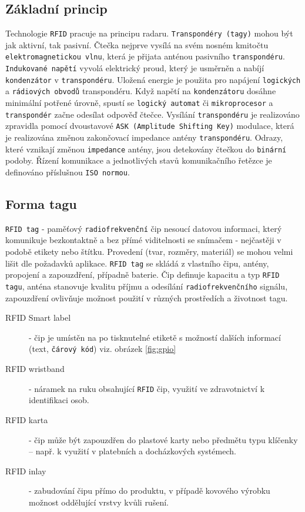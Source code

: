 \documentclass[czech,BP]{thesiskiv}
\begin{document}
\subsection{Základní princip}
Technologie \texttt{RFID} pracuje na principu radaru. \texttt{Transpondéry (tagy)} mohou být jak aktivní, tak pasivní. Čtečka nejprve vysílá na svém nosném kmitočtu \texttt{elektromagnetickou vlnu}, která je přijata anténou pasivního \texttt{transpondéru}. \texttt{Indukované napětí} vyvolá elektrický proud, který je usměrněn a nabíjí \texttt{kondenzátor} v \texttt{transpondéru}. Uložená energie je použita pro napájení \texttt{logických} a \texttt{rádiových obvodů} transpondéru. Když napětí na \texttt{kondenzátoru} dosáhne minimální potřené úrovně, spustí se \texttt{logický automat} či \texttt{mikroprocesor} a \texttt{transpondér} začne odesílat odpověď čtečce. Vysílání \texttt{transpondéru} je realizováno zpravidla pomocí dvoustavové \texttt{ASK (Amplitude Shifting Key)} modulace, která je realizována změnou zakončovací impedance antény \texttt{transpondéru}. Odrazy, které vznikají změnou \texttt{impedance} antény, jsou detekovány čtečkou do \texttt{binární} podoby. Řízení komunikace a jednotlivých stavů komunikačního řetězce je definováno příslušnou \texttt{ISO normou}.\cite{dolevcek2010identifikace}

\subsection{Forma tagu}
\texttt{RFID tag} - paměťový \texttt{radiofrekvenční} čip nesoucí datovou informaci, který komunikuje bezkontaktně a bez přímé viditelnosti se snímačem - nejčastěji v podobě etikety nebo štítku. Provedení (tvar, rozměry, materiál) se mohou velmi lišit dle požadavků aplikace. \texttt{RFID tag} se skládá z vlastního čipu, antény, propojení a zapouzdření, případně baterie. Čip definuje kapacitu a typ \texttt{RFID tagu}, anténa stanovuje kvalitu příjmu a odesílání \texttt{radiofrekvenčního} signálu, zapouzdření ovlivňuje možnost použití v různých prostředích a životnost tagu.\cite{dolevcek2010identifikace}

\newpage
\begin{description}
\item [RFID Smart label]
- čip je umístěn na po tisknutelné etiketě s možností dalších informací (text, \texttt{čárový kód}) viz. obrázek \ref{fig:gpio}
\item [RFID wristband] - náramek na ruku obsahující \texttt{RFID} čip,  využití ve zdravotnictví k identifikaci osob.
\item [RFID karta] - čip může být zapouzdřen do plastové karty nebo předmětu typu klíčenky – např. k využití v platebních a docházkových systémech.
\item [RFID inlay] - zabudování čipu přímo do produktu, v případě kovového výrobku možnost oddělující vrstvy kvůli rušení.
\end{description}
\end{document}
